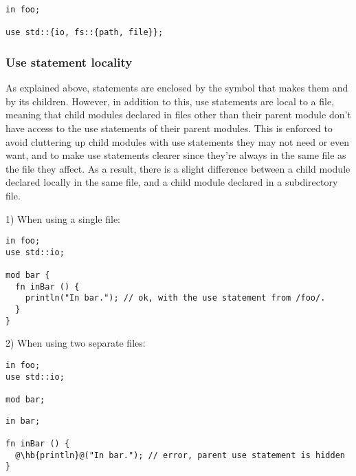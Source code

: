 \begin{lstlisting}[style=coloredverbatim]
in foo;

use std::{io, fs::{path, file}};
\end{lstlisting}

\subsubsection*{Use statement locality}

As explained above,  statements are enclosed by the symbol that
makes them and by its children. However, in addition to this, use statements are
local to a file, meaning that child modules declared in files other than their
parent module don't have access to the use statements of their parent modules.
This is enforced to avoid cluttering up child modules with use statements they
may not need or even want, and to make use statements clearer since they're
always in the same file as the file they affect. As a result, there is a slight
difference between a child module declared locally in the same file, and a child
module declared in a subdirectory file.
\smallskip

1) When using a single file:

\begin{lstlisting}[caption=\textit{./foo.yr}, style=coloredverbatim]
in foo;
use std::io;

mod bar {
  fn inBar () {
    println("In bar."); // ok, with the use statement from /foo/.
  }
}
\end{lstlisting}

2) When using two separate files:

\hspace{-0.03\linewidth}%
\begin{minipage}[t][][t]{0.3\linewidth}%
\begin{lstlisting}[caption=\textit{./foo.yr}, style=coloredverbatim]
in foo;
use std::io;

mod bar;
\end{lstlisting}
\end{minipage}%
\hspace{0.02\linewidth}%
\begin{minipage}[t][][t]{0.65\linewidth}
\begin{lstlisting}[caption=\textit{./foo/bar.yr}, style=coloredverbatim, escapechar=@]
in bar;

fn inBar () {
  @\hb{println}@("In bar."); // error, parent use statement is hidden
}
\end{lstlisting}
\end{minipage}%

